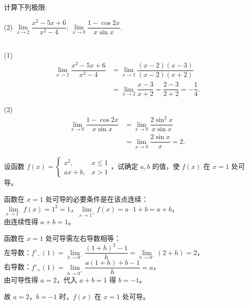 \documentclass{exam-zh}
\begin{document}
\begin{problem}[points = 10]
  计算下列极限:

  \begin{tasks}[label=(\arabic*)](2)
      \task $\lim\limits_{x \to 2} \dfrac{x^2 - 5x + 6}{x^2 - 4}$;
      \task $\lim\limits_{x \to 0} \dfrac{1 - \cos 2x}{x \sin x}$.
  \end{tasks}
\end{problem}

\begin{solution}\\
  (1) 
  \begin{align*}
  \lim\limits_{x \to 2} \dfrac{x^2 - 5x + 6}{x^2 - 4} &= \lim\limits_{x \to 2} \dfrac{(x-2)(x-3)}{(x-2)(x+2)} \\
  &= \lim\limits_{x \to 2} \dfrac{x-3}{x+2} = \dfrac{2-3}{2+2} = -\dfrac{1}{4}.
  \end{align*}

  (2)
    \begin{align*}
  \lim\limits_{x \to 0} \dfrac{1 - \cos 2x}{x \sin x} &= \lim\limits_{x \to 0} \dfrac{2\sin^2 x}{x \sin x} \\
  &= \lim\limits_{x \to 0} \dfrac{2\sin x}{x} = 2.
    \end{align*}
\end{solution}

\begin{problem}[points = 10]
  设函数 $f(x) = \begin{cases} 
  x^2, & x \leq 1 \\
  ax + b, & x > 1 
  \end{cases}$，试确定 $a, b$ 的值，使 $f(x)$ 在 $x = 1$ 处可导。
\end{problem}

\begin{solution}
  函数在 $x=1$ 处可导的必要条件是在该点连续：\\
  $\lim\limits_{x \to 1^-} f(x) = 1^2 = 1$，$\lim\limits_{x \to 1^+} f(x) = a \cdot 1 + b = a + b$，\\
  由连续性得 $a + b = 1$。

  函数在 $x=1$ 处可导需左右导数相等：\\
  左导数：$f'_-(1) = \lim\limits_{h \to 0^-} \dfrac{(1+h)^2 - 1}{h} = \lim\limits_{h \to 0^-} (2 + h) = 2$，\\
  右导数：$f'_+(1) = \lim\limits_{h \to 0^+} \dfrac{a(1+h) + b - 1}{h} = a$，\\
  由可导性得 $a = 2$，代入 $a + b = 1$ 得 $b = -1$。

  故 $a = 2$，$b = -1$ 时，$f(x)$ 在 $x = 1$ 处可导。
\end{solution}
\end{document}
